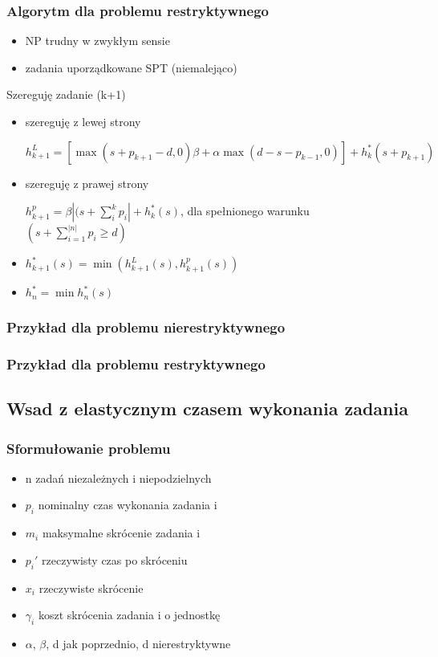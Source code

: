 \documentclass[12pt,a4paper]{article}
\begin{document}
\subsubsection{Algorytm dla problemu restryktywnego}
\begin{itemize}
	\item NP trudny w zwykłym sensie
	\item zadania uporządkowane SPT (niemalejąco)
\end{itemize}

Szereguję zadanie (k+1)
\begin{itemize}
	\item szereguję z lewej strony
	
	$h_{k+1}^{L}=[\max(s+p_{k+1}-d,0)\beta + \alpha\max(d-s-p_{k-1},0)]+h_{k}^{*}(s+p_{k+1})$
	\item szereguję z prawej strony
	
	$h_{k+1}^{p}=\beta\left | (s+\sum\limits_{i}^{k}p_{i} \right | +h_{k}^{*}(s)$, dla spełnionego warunku $(s+\sum\limits_{i=1}^{|n|}p_{i}\geq d)$
	\item $h_{k+1}^{*}(s)=\min(h_{k+1}^{L}(s), h_{k+1}^{p}(s))$
	\item $h_{n}^{*}=\min h_{n}^{*}(s)$
\end{itemize}
\subsubsection{Przykład dla problemu nierestryktywnego}
\subsubsection{Przykład dla problemu restryktywnego}

\subsection{Wsad z elastycznym czasem wykonania zadania}
\subsubsection{Sformułowanie problemu}
\begin{itemize}
\item n zadań niezależnych i niepodzielnych
\item $p_{i}$ nominalny czas wykonania zadania i
\item $m_{i}$ maksymalne skrócenie zadania i
\item $p_{i}'$ rzeczywisty czas po skróceniu
\item $x_{i}$ rzeczywiste skrócenie
\item $\gamma_{i}$ koszt skrócenia zadania i o jednostkę
\item $\alpha$, $\beta$, d jak poprzednio, d nierestryktywne
\end{itemize}
\end{document}

